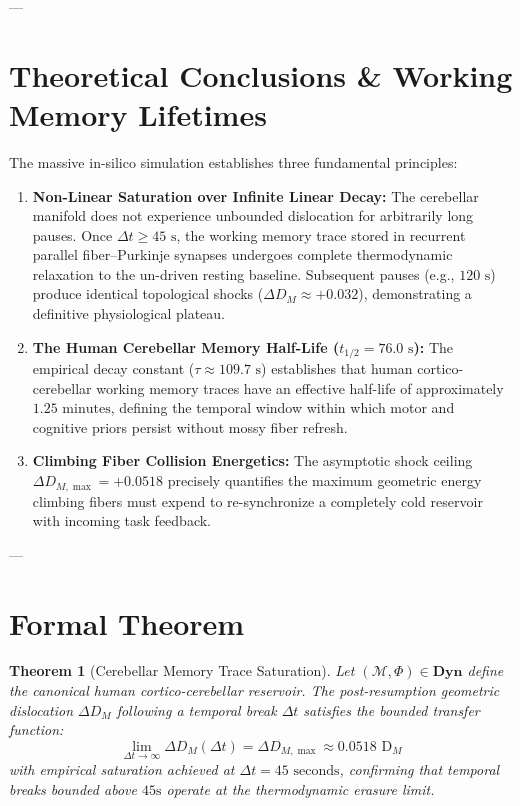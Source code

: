 \documentclass[11pt,twoside,a4paper]{article}
\newtheorem{theorem}{Theorem}
\begin{document}
---

\section{Theoretical Conclusions \& Working Memory Lifetimes}

The massive in-silico simulation establishes three fundamental principles:

\begin{enumerate}
    \item \textbf{Non-Linear Saturation over Infinite Linear Decay:}
    The cerebellar manifold does not experience unbounded dislocation for arbitrarily long pauses. Once $\Delta t \ge 45\text{ s}$, the working memory trace stored in recurrent parallel fiber--Purkinje synapses undergoes complete thermodynamic relaxation to the un-driven resting baseline. Subsequent pauses (e.g., $120\text{ s}$) produce identical topological shocks ($\Delta D_M \approx +0.032$), demonstrating a definitive physiological plateau.
    
    \item \textbf{The Human Cerebellar Memory Half-Life ($t_{1/2} = 76.0\text{ s}$):}
    The empirical decay constant ($\tau \approx 109.7\text{ s}$) establishes that human cortico-cerebellar working memory traces have an effective half-life of approximately $1.25\text{ minutes}$, defining the temporal window within which motor and cognitive priors persist without mossy fiber refresh.
    
    \item \textbf{Climbing Fiber Collision Energetics:}
    The asymptotic shock ceiling $\Delta D_{M,\max} = +0.0518$ precisely quantifies the maximum geometric energy climbing fibers must expend to re-synchronize a completely cold reservoir with incoming task feedback.
\end{enumerate}

---

\section{Formal Theorem}

\begin{theorem}[Cerebellar Memory Trace Saturation]
Let $(\mathcal{M}, \Phi) \in \mathbf{Dyn}$ define the canonical human cortico-cerebellar reservoir. The post-resumption geometric dislocation $\Delta D_M$ following a temporal break $\Delta t$ satisfies the bounded transfer function:
\begin{equation}
\lim_{\Delta t \to \infty} \Delta D_M(\Delta t) = \Delta D_{M,\max} \approx 0.0518 \text{ D}_M
\end{equation}
with empirical saturation achieved at $\Delta t = 45\text{ seconds}$, confirming that temporal breaks bounded above $45\text{s}$ operate at the thermodynamic erasure limit.
\end{theorem}
\end{document}
